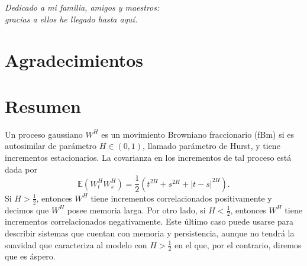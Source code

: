 \documentclass[letterpaper,12pt,oneside]{book}
\theoremstyle{plain}
\numberwithin{theorem}{section}
\begin{document}

\printnomenclature

\mbox{}
\frontmatter
\chapter*{}
\begin{flushright}%
  \emph{Dedicado a mi familia, amigos y maestros:\\
gracias a ellos he llegado hasta aquí.}
  \thispagestyle{empty}
\end{flushright}
\chapter{Agradecimientos}

\chapter*{Resumen}
Un proceso gaussiano $W^H$ es un movimiento Browniano fraccionario (fBm) si es autosimilar de parámetro $H\in(0,1)$, llamado parámetro de Hurst, y tiene incrementos estacionarios. La covarianza en los incrementos de tal proceso está dada por
	\begin{equation}
		\mathbb E(W^H_tW^H_s)=\frac{1}{2}(t^{2H}+s^{2H}+|t-s|^{2H}).
	\end{equation}
Si $H>\frac{1}{2}$, entonces $W^H$ tiene incrementos correlacionados positivamente y decimos que $W^H$ posee memoria larga. Por otro lado, si $H<\frac{1}{2}$, entonces $W^H$ tiene incrementos correlacionados negativamente. Este último caso puede usarse para describir sistemas que cuentan con memoria y persistencia, aunque no tendrá la suavidad que caracteriza al modelo con $H>\frac{1}{2}$ en el que, por el contrario, diremos que es áspero. 
\end{document}
